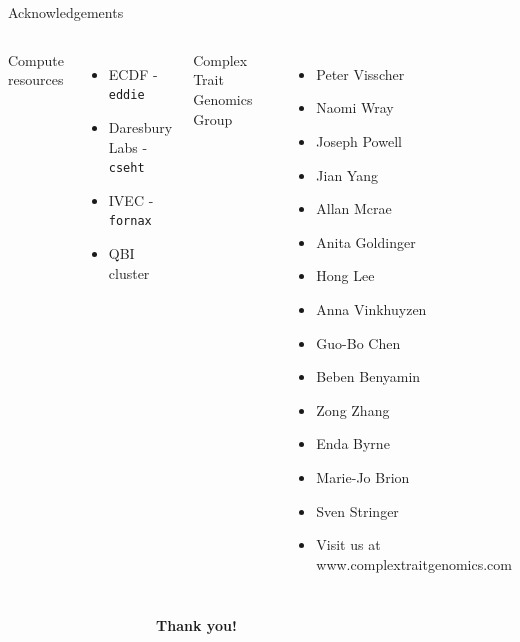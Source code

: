 \documentclass{beamer}
\begin{document}

\section*{}

\begin{frame}{Acknowledgements}




	\begin{columns}[c]

			{\tiny
				Compute resources
				\begin{itemize}
					\item ECDF - {\tt eddie}
					\item Daresbury Labs - {\tt cseht}
					\item IVEC - {\tt fornax}
					\item QBI cluster
				\end{itemize}
			}

			{\tiny
				Complex Trait Genomics Group
				\begin{itemize}
					\item Peter Visscher
					\item Naomi Wray
					\item {\color{red} Joseph Powell}
					\item Jian Yang
					\item Allan Mcrae
					\item Anita Goldinger
					\item Hong Lee
					\item Anna Vinkhuyzen
					\item Guo-Bo Chen
					\item Beben Benyamin
					\item Zong Zhang
					\item Enda Byrne
					\item Marie-Jo Brion
					\item Sven Stringer
					\item Visit us at www.complextraitgenomics.com
				\end{itemize}
			}
		\end{columns}
\end{frame}


\begin{frame}
	\begin{columns}[ccc]
		\begin{column}{0.3\textwidth} \end{column}
		\begin{column}{0.3\textwidth}
			\centering
			\textbf{Thank you!}
		\end{column}
		\begin{column}{0.3\textwidth}\end{column}
	\end{columns}
\end{frame}
\end{document}
